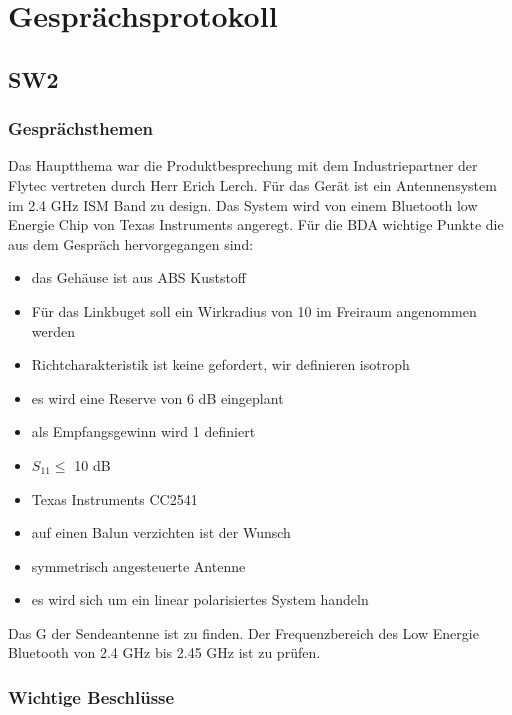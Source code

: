 \documentclass[10pt,a4paper]{report}
\begin{document}
\chapter{Gesprächsprotokoll}
\section{SW2}
\subsection{Gesprächsthemen}


Das Hauptthema war die Produktbesprechung mit dem Industriepartner der
Flytec vertreten durch Herr Erich Lerch. Für das Gerät ist ein
Antennensystem im 2.4 GHz ISM Band zu design. Das System wird von einem Bluetooth low Energie Chip von Texas Instruments angeregt.
Für die BDA wichtige Punkte die aus dem Gespräch hervorgegangen sind:
\begin{itemize}
	\item das Gehäuse ist aus ABS Kuststoff
	\item Für das Linkbuget soll ein Wirkradius von 10 im Freiraum angenommen werden
	\item Richtcharakteristik ist keine gefordert, wir definieren isotroph 
	\item es wird eine Reserve von 6 dB eingeplant
	\item als Empfangsgewinn wird 1 definiert
	\item $S_{11} \leq$ 10 dB
	\item Texas Instruments CC2541
	\item auf einen Balun verzichten ist der Wunsch
	\item symmetrisch angesteuerte Antenne
	\item es wird sich um ein linear polarisiertes System handeln
\end{itemize}
Das G der Sendeantenne ist zu finden. Der Frequenzbereich des Low Energie Bluetooth von 2.4 GHz bis 2.45 GHz ist zu prüfen.
\subsection{Wichtige Beschlüsse}
\end{document}
